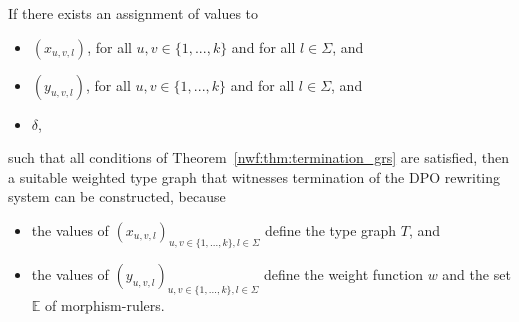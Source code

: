 If there exists an assignment of values to 
    \begin{itemize}
        \item $(x_{u,v,l})$, for all $u,v \mathop{\in} \{1,...,k\}$ and for all $l \mathop{\in} \Sigma$, and
        \item $(y_{u,v,l})$, for all $u,v \mathop{\in} \{1,...,k\}$ and for all $l \mathop{\in} \Sigma$, and
        \item $\delta$,
    \end{itemize} 
    such that all conditions of Theorem~\ref{nwf:thm:termination_grs} are satisfied, then a suitable weighted type graph that witnesses termination of the DPO rewriting system can be constructed, because
    \begin{itemize}
        \item the values of \( (x_{u,v,l})_{u,v \mathop{\in} \{1,...,k\}, l \mathop{\in} \Sigma} \) define the type graph $T$, and
        \item the values of \( (y_{u,v,l})_{u,v \mathop{\in} \{1,...,k\}, l \mathop{\in} \Sigma} \) define the weight function $w$ and the set $\mathbb{E}$ of morphism-rulers.
    \end{itemize} 